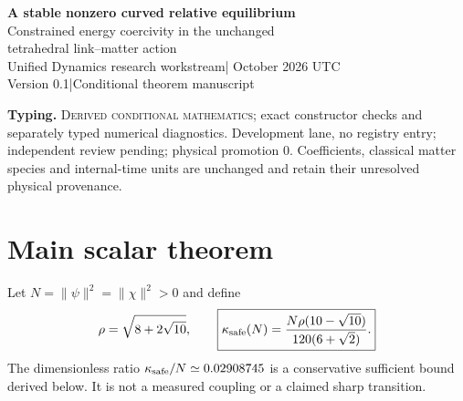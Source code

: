 \documentclass[11pt,a4paper]{article}
\begin{document}
\begin{center}
{\Large\bfseries A stable nonzero curved relative equilibrium}\\[8pt]
{\large Constrained energy coercivity in the unchanged\\tetrahedral link--matter action}\\[10pt]
Unified Dynamics research workstream\quad | October 2026 UTC\\
Version 0.1\quad |\quad Conditional theorem manuscript
\end{center}
\begin{abstract}
The completed nonlinear obstruction concerns the neutral flat vertex-supported family, rather than every matter background. We now construct a different exact branch: scalar links $U_e^*=-ib_e$ have diamond holonomy $-1$, and the matter fields occupy the strictly positive lowest mode of the resulting real Hermitian operator. This branch is an exact relative equilibrium for every magnetic coefficient. At zero stiffness it is the unique constrained global minimizing orbit. For an explicit positive range of magnetic stiffness, the constrained energy has a positive quadratic form transverse to gauge and species phases, proving nonlinear orbital stability at fixed nonzero species norms. Separately, compactness and electric coercivity guarantee a stable global minimizing set at every finite rank and coefficient; a trial-energy comparison forces all its members to be nonflat in a stated small-stiffness range. The scalar orbit theorem does not imply stability against additional color directions. All statements are conditional on the existing candidate action.
\end{abstract}
\textbf{Typing.} \textsc{Derived conditional mathematics}; exact constructor checks and separately typed numerical diagnostics. Development lane, no registry entry; independent review pending; physical promotion $0$. Coefficients, classical matter species and internal-time units are unchanged and retain their unresolved physical provenance.

\section{Main scalar theorem}
Let $N=\|\psi\|^2=\|\chi\|^2>0$ and define
\[
\rho=\sqrt{8+2\sqrt{10}},\qquad
\boxed{\kappa_{\rm safe}(N)=
\frac{N\rho(10-\sqrt{10})}{120(6+\sqrt2)}.}
\]
The dimensionless ratio $\kappa_{\rm safe}/N\simeq0.02908745$ is a conservative sufficient bound derived below. It is not a measured coupling or a claimed sharp transition.
\end{document}
